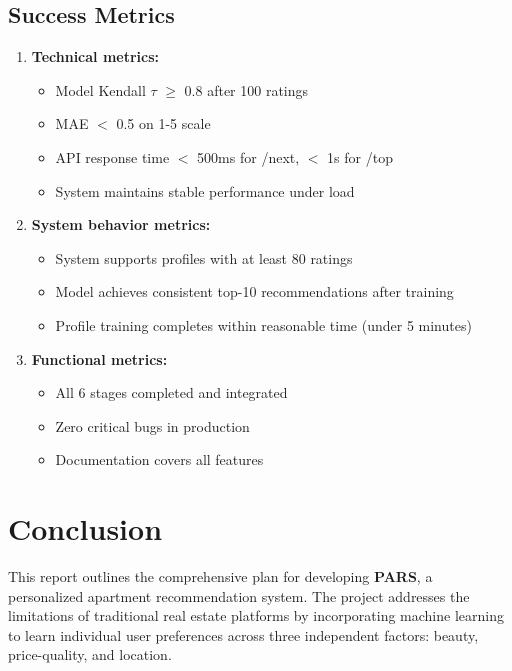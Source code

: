 \documentclass[12pt,a4paper]{article}
\begin{document}
\subsection{Success Metrics}

\begin{enumerate}
    \item \textbf{Technical metrics:}
    \begin{itemize}
        \item Model Kendall $\tau$ $\geq$ 0.8 after 100 ratings
        \item MAE $<$ 0.5 on 1-5 scale
        \item API response time $<$ 500ms for /next, $<$ 1s for /top
        \item System maintains stable performance under load
    \end{itemize}
    
    \item \textbf{System behavior metrics:}
    \begin{itemize}
        \item System supports profiles with at least 80 ratings
        \item Model achieves consistent top-10 recommendations after training
        \item Profile training completes within reasonable time (under 5 minutes)
    \end{itemize}
    
    \item \textbf{Functional metrics:}
    \begin{itemize}
        \item All 6 stages completed and integrated
        \item Zero critical bugs in production
        \item Documentation covers all features
    \end{itemize}
\end{enumerate}

\newpage

\section{Conclusion}

This report outlines the comprehensive plan for developing \textbf{PARS}, a personalized apartment recommendation system. The project addresses the limitations of traditional real estate platforms by incorporating machine learning to learn individual user preferences across three independent factors: beauty, price-quality, and location.
\end{document}
